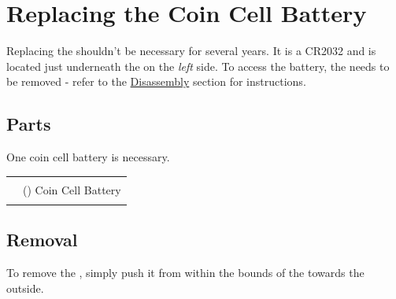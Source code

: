 \chapter{Replacing the Coin Cell Battery} \label{Replacing Battery}

Replacing the \hyperref[Coin Cell Battery]{} shouldn't be necessary for
several years.  It is a \num{CR2032} and is located just underneath the 
on the \textit{left} side.  To access the battery, the  needs to be
removed - refer to the \hyperref[Disassembly]{Disassembly} section for
instructions.

\section{Parts}

One  coin cell battery is necessary.

\begin{table}[H]
\centering
\begin{tabu} { X[1,r,m] | X[6,l,m] }
  \thrule
   &  \\  &  () Coin Cell Battery \\
  \bhrule
\end{tabu}
\end{table}

\section{Removal}

To remove the , simply push it from within the bounds of the 
towards the outside.

